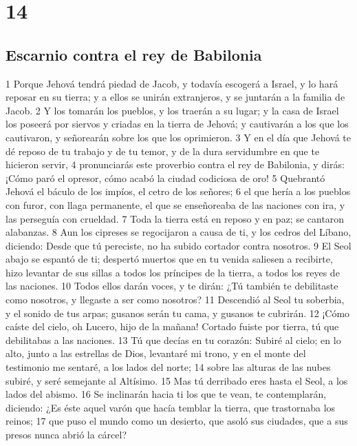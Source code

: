 \chapter{14}

\section*{Escarnio contra el rey de Babilonia}

1 Porque Jehová tendrá piedad de Jacob, y todavía escogerá a Israel, y lo hará reposar en su tierra; y a ellos se unirán extranjeros, y se juntarán a la familia de Jacob.
2 Y los tomarán los pueblos, y los traerán a su lugar; y la casa de Israel los poseerá por siervos y criadas en la tierra de Jehová; y cautivarán a los que los cautivaron, y señorearán sobre los que los oprimieron.
3 Y en el día que Jehová te dé reposo de tu trabajo y de tu temor, y de la dura servidumbre en que te hicieron servir,
4 pronunciarás este proverbio contra el rey de Babilonia, y dirás: ¡Cómo paró el opresor, cómo acabó la ciudad codiciosa de oro!
5 Quebrantó Jehová el báculo de los impíos, el cetro de los señores;
6 el que hería a los pueblos con furor, con llaga permanente, el que se enseñoreaba de las naciones con ira, y las perseguía con crueldad.
7 Toda la tierra está en reposo y en paz; se cantaron alabanzas.
8 Aun los cipreses se regocijaron a causa de ti, y los cedros del Líbano, diciendo: Desde que tú pereciste, no ha subido cortador contra nosotros.
9 El Seol abajo se espantó de ti; despertó muertos que en tu venida saliesen a recibirte, hizo levantar de sus sillas a todos los príncipes de la tierra, a todos los reyes de las naciones.
10 Todos ellos darán voces, y te dirán: ¿Tú también te debilitaste como nosotros, y llegaste a ser como nosotros?
11 Descendió al Seol tu soberbia, y el sonido de tus arpas; gusanos serán tu cama, y gusanos te cubrirán.
12 ¡Cómo caíste del cielo, oh Lucero, hijo de la mañana! Cortado fuiste por tierra, tú que debilitabas a las naciones.
13 Tú que decías en tu corazón: Subiré al cielo; en lo alto, junto a las estrellas de Dios, levantaré mi trono, y en el monte del testimonio me sentaré, a los lados del norte;
14 sobre las alturas de las nubes subiré, y seré semejante al Altísimo.
15 Mas tú derribado eres hasta el Seol, a los lados del abismo.
16 Se inclinarán hacia ti los que te vean, te contemplarán, diciendo: ¿Es éste aquel varón que hacía temblar la tierra, que trastornaba los reinos;
17 que puso el mundo como un desierto, que asoló sus ciudades, que a sus presos nunca abrió la cárcel?
